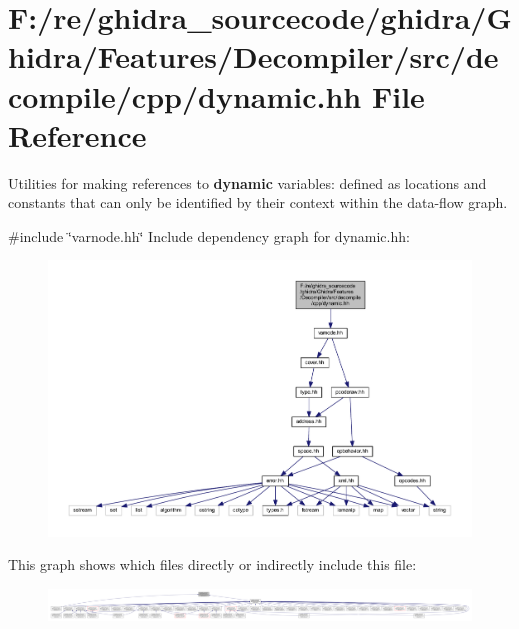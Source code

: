 \hypertarget{dynamic_8hh}{}\section{F\+:/re/ghidra\+\_\+sourcecode/ghidra/\+Ghidra/\+Features/\+Decompiler/src/decompile/cpp/dynamic.hh File Reference}
\label{dynamic_8hh}


Utilities for making references to {\bfseries{dynamic}} variables\+: defined as locations and constants that can only be identified by their context within the data-\/flow graph.  


{\ttfamily \#include \char`\"{}varnode.\+hh\char`\"{}}\newline
Include dependency graph for dynamic.\+hh\+:
\nopagebreak
\begin{figure}[H]
\begin{center}
\leavevmode
\includegraphics[width=350pt]{dynamic_8hh__incl}
\end{center}
\end{figure}
This graph shows which files directly or indirectly include this file\+:
\nopagebreak
\begin{figure}[H]
\begin{center}
\leavevmode
\includegraphics[width=350pt]{dynamic_8hh__dep__incl}
\end{center}
\end{figure}
